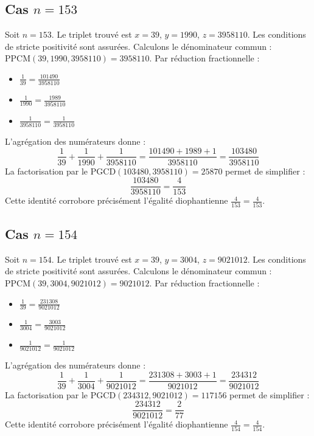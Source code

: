 \documentclass[11pt,a4paper]{article}
\begin{document}
\subsection{Cas $n = 153$}
Soit $n = 153$. Le triplet trouvé est $x = 39$, $y = 1990$, $z = 3958110$.
Les conditions de stricte positivité sont assurées.
Calculons le dénominateur commun : $\text{PPCM}(39, 1990, 3958110) = 3958110$.
Par réduction fractionnelle :
\begin{itemize}
    \item $\frac{1}{39} = \frac{101490}{3958110}$
    \item $\frac{1}{1990} = \frac{1989}{3958110}$
    \item $\frac{1}{3958110} = \frac{1}{3958110}$
\end{itemize}
L'agrégation des numérateurs donne :
$$ \frac{1}{39} + \frac{1}{1990} + \frac{1}{3958110} = \frac{101490 + 1989 + 1}{3958110} = \frac{103480}{3958110} $$
La factorisation par le $\text{PGCD}(103480, 3958110) = 25870$ permet de simplifier :
$$ \frac{103480}{3958110} = \frac{4}{153} $$
Cette identité corrobore précisément l'égalité diophantienne $\frac{4}{153} = \frac{4}{153}$.

\subsection{Cas $n = 154$}
Soit $n = 154$. Le triplet trouvé est $x = 39$, $y = 3004$, $z = 9021012$.
Les conditions de stricte positivité sont assurées.
Calculons le dénominateur commun : $\text{PPCM}(39, 3004, 9021012) = 9021012$.
Par réduction fractionnelle :
\begin{itemize}
    \item $\frac{1}{39} = \frac{231308}{9021012}$
    \item $\frac{1}{3004} = \frac{3003}{9021012}$
    \item $\frac{1}{9021012} = \frac{1}{9021012}$
\end{itemize}
L'agrégation des numérateurs donne :
$$ \frac{1}{39} + \frac{1}{3004} + \frac{1}{9021012} = \frac{231308 + 3003 + 1}{9021012} = \frac{234312}{9021012} $$
La factorisation par le $\text{PGCD}(234312, 9021012) = 117156$ permet de simplifier :
$$ \frac{234312}{9021012} = \frac{2}{77} $$
Cette identité corrobore précisément l'égalité diophantienne $\frac{4}{154} = \frac{4}{154}$.
\end{document}

